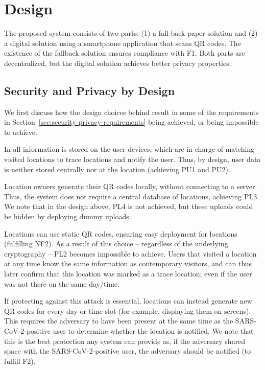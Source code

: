 \section{Design}
The proposed system consists of two parts: (1) a fall-back paper solution and (2) a digital solution using a smartphone application that scans QR codes. The existence of the fallback solution ensures compliance with F1. Both parts are decentralized, but the digital solution achieves better privacy properties.

\subsection{Security and Privacy by Design}
\label{sec:sec-priv-design}

We first discuss how the design choices behind \name result in some of the requirements in Section~\ref{sec:security-privacy-requirements} being achieved, or being impossible to achieve.

 In \name all information is stored on the user devices, which are in charge of matching visited locations to trace locations and notify the user. Thus, by design, user data is neither stored centrally nor at the location (achieving PU1 and PU2).

 Location owners generate their QR codes
locally, without connecting to a server. Thus, the system does not require a
central database of locations, achieving PL3.
We note that in the design above, PL4 is not achieved, but these uploads could be hidden by deploying dummy uploads.

 Locations can use static QR codes, ensuring easy deployment for locations (fulfilling NF2). As a result of this choice -- regardless of the underlying cryptography -- PL2 becomes impossible to achieve. Users that visited a location at any time know the same information as contemporary visitors, and can thus later confirm that this location was marked as a trace location; even if the user was not there on the same day/time.

If protecting against this attack is essential, locations can instead generate new QR codes for every day or time-slot (for example, displaying them on screens). This requires the adversary to have been present at the same time as the SARS-CoV-2-positive user to determine whether the location is notified. We note that this is the best protection any system can provide as, if the adversary shared space with the SARS-CoV-2-positive user, the adversary should be notified (to fulfill F2).


